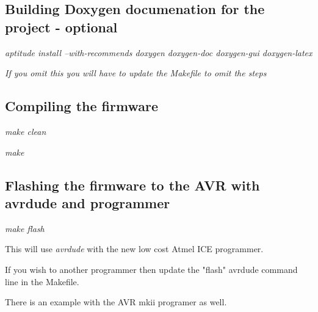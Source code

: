 \begin{DoxyPre}\subsection*{Building Doxygen documenation for the project - optional}\end{DoxyPre}



\begin{DoxyPre}
\begin{DoxyItemize}
\item {\itshape aptitude install --with-recommends doxygen doxygen-doc doxygen-gui doxygen-latex}
\item {\itshape If you omit this you will have to update the Makefile to omit the steps}
\end{DoxyItemize}\end{DoxyPre}



\begin{DoxyPre}\subsection*{Compiling the firmware}\end{DoxyPre}



\begin{DoxyPre}
\begin{DoxyItemize}
\item {\itshape make clean}
\item {\itshape make}
\end{DoxyItemize}\end{DoxyPre}



\begin{DoxyPre}\subsection*{Flashing the firmware to the AVR with avrdude and programmer}\end{DoxyPre}



\begin{DoxyPre}
\begin{DoxyItemize}
\item {\itshape make flash}
\begin{DoxyItemize}
\item This will use {\itshape avrdude} with the new low cost Atmel ICE programmer.
\begin{DoxyItemize}
\item If you wish to another programmer then update the "flash" avrdude command line in the Makefile.
\item There is an example with the AVR mkii programer as well.
\end{DoxyItemize}
\end{DoxyItemize}
\end{DoxyItemize}\end{DoxyPre}



